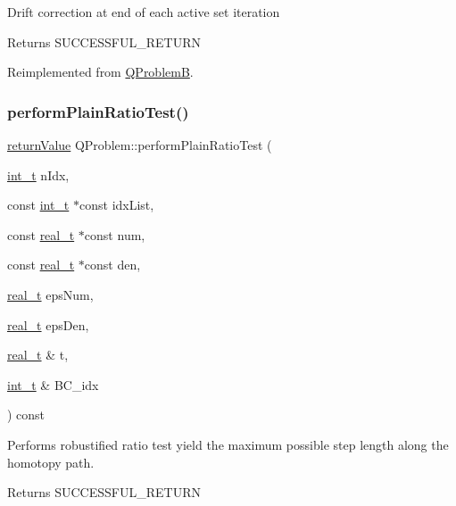 Drift correction at end of each active set iteration \begin{DoxyReturn}{Returns}
S\+U\+C\+C\+E\+S\+S\+F\+U\+L\+\_\+\+R\+E\+T\+U\+RN 
\end{DoxyReturn}


Reimplemented from \hyperlink{class_q_problem_b}{Q\+ProblemB}.

\mbox{\label{class_q_problem_a70ddd98f39cdbf542426eff10b3d1eb3}} 
\subsubsection{\texorpdfstring{perform\+Plain\+Ratio\+Test()}{performPlainRatioTest()}}
{\footnotesize\ttfamily \hyperlink{_message_handling_8hpp_a81d556f613bfbabd0b1f9488c0fa865e}{return\+Value} Q\+Problem\+::perform\+Plain\+Ratio\+Test (\begin{DoxyParamCaption}\item[{\hyperlink{_types_8hpp_ab6fd6105e64ed14a0c9281326f05e623}{int\+\_\+t}}]{n\+Idx,  }\item[{const \hyperlink{_types_8hpp_ab6fd6105e64ed14a0c9281326f05e623}{int\+\_\+t} $\ast$const}]{idx\+List,  }\item[{const \hyperlink{qp_o_a_s_e_s__wrapper_8h_a0d00e2b3dfadee81331bbb39068570c4}{real\+\_\+t} $\ast$const}]{num,  }\item[{const \hyperlink{qp_o_a_s_e_s__wrapper_8h_a0d00e2b3dfadee81331bbb39068570c4}{real\+\_\+t} $\ast$const}]{den,  }\item[{\hyperlink{qp_o_a_s_e_s__wrapper_8h_a0d00e2b3dfadee81331bbb39068570c4}{real\+\_\+t}}]{eps\+Num,  }\item[{\hyperlink{qp_o_a_s_e_s__wrapper_8h_a0d00e2b3dfadee81331bbb39068570c4}{real\+\_\+t}}]{eps\+Den,  }\item[{\hyperlink{qp_o_a_s_e_s__wrapper_8h_a0d00e2b3dfadee81331bbb39068570c4}{real\+\_\+t} \&}]{t,  }\item[{\hyperlink{_types_8hpp_ab6fd6105e64ed14a0c9281326f05e623}{int\+\_\+t} \&}]{B\+C\+\_\+idx }\end{DoxyParamCaption}) const\hspace{0.3cm}{\ttfamily [protected]}}

Performs robustified ratio test yield the maximum possible step length along the homotopy path. \begin{DoxyReturn}{Returns}
S\+U\+C\+C\+E\+S\+S\+F\+U\+L\+\_\+\+R\+E\+T\+U\+RN 
\end{DoxyReturn}

